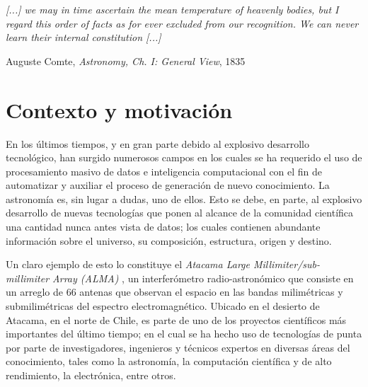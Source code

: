 \begin{intro}


\vspace{1em}
\hfill{}
\begin{minipage}{9cm}{
\begin{spacing}{0.9}
\small
\noindent
\textit{[...] we may in time ascertain the mean temperature of heavenly bodies, but I regard this order of facts as for ever excluded from our recognition. We can never learn their internal constitution [...]}
\end{spacing}
\vspace{1em}
\hfill{}{Auguste Comte, \textit{Astronomy, Ch. I: General View}, 1835}
}
\vspace{2em}
\end{minipage}

\section*{Contexto y motivación}

En los últimos tiempos, y en gran parte debido al explosivo desarrollo tecnológico, han surgido numerosos campos en los cuales se ha requerido el uso de procesamiento masivo de datos e inteligencia computacional con el fin de automatizar y auxiliar el proceso de generación de nuevo conocimiento. La astronomía es, sin lugar a dudas, uno de ellos. Esto se debe, en parte, al explosivo desarrollo de nuevas tecnologías que ponen al alcance de la comunidad científica una cantidad nunca antes vista de datos; los cuales contienen abundante información sobre el universo, su composición, estructura, origen y destino.

Un claro ejemplo de esto lo constituye el \textit{Atacama Large Millimiter/sub-millimiter Array (ALMA)} \cite{wootten2009atacama}, un interferómetro radio-astronómico que consiste en un arreglo de 66 antenas que observan el espacio en las bandas milimétricas y submilimétricas del espectro electromagnético. Ubicado en el desierto de Atacama, en el norte de Chile, es parte de uno de los proyectos científicos más importantes del último tiempo; en el cual se ha hecho uso de tecnologías de punta por parte de investigadores, ingenieros y técnicos expertos en diversas áreas del conocimiento, tales como la astronomía, la computación científica y de alto rendimiento, la electrónica, entre otros.


\end{intro}
